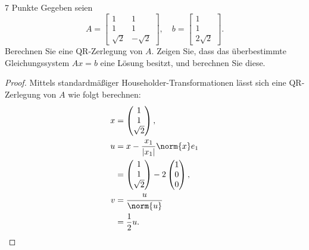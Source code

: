 \documentclass{problemset}
\author{Michael van Straten}
\begin{document}
\maketitle

\setcounter{problem}{2}

\begin{problem}{7 Punkte}
Gegeben seien
\begin{equation}
    A =
    \begin{bmatrix}
        1        & 1         \\
        1        & 1         \\
        \sqrt{2} & -\sqrt{2}
    \end{bmatrix}, \quad
    b =
    \begin{bmatrix}
        1 \\
        1 \\
        2\sqrt{2}
    \end{bmatrix}.
\end{equation}
Berechnen Sie eine QR-Zerlegung von \( A \). Zeigen Sie, dass das überbestimmte
Gleichungssystem \( Ax = b \) eine Lösung besitzt, und berechnen Sie diese.

\begin{proof}
    Mittels standardmäßiger Householder-Transformationen lässt sich eine
    QR-Zerlegung von \( A \) wie folgt berechnen:
    \begin{align*}
        x & = \begin{pmatrix}
                  1 \\ 1 \\ \sqrt{2}
              \end{pmatrix},                \\
        u & = x - \frac{x_1}{|x_1|} \norm{x} e_1     \\
          & = \begin{pmatrix}
                  1 \\ 1 \\ \sqrt{2}
              \end{pmatrix} - 2 \begin{pmatrix}
                                    1 \\ 0 \\ 0
                                \end{pmatrix}, \\
        v & = \frac{u}{\norm{u}}               \\
          & = \frac{1}{2} u.
    \end{align*}


\end{proof}
\end{problem}
\end{document}
